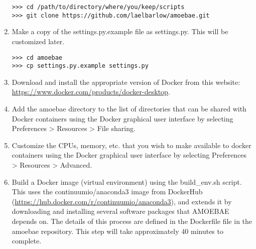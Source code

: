 \documentclass[12pt,letterpaper]{article}
\begin{document}
\begin{linenumbers}
\begin{enumerate}
\begin{lstlisting}
>>> cd /path/to/directory/where/you/keep/scripts
>>> git clone https://github.com/laelbarlow/amoebae.git
\end{lstlisting}


%



\item Make a copy of the settings.py.example file as settings.py. This will be
    customized later. 

\begin{lstlisting}
>>> cd amoebae
>>> cp settings.py.example settings.py
\end{lstlisting}


\item Download and install the appropriate version of Docker from this website:
    \url{https://www.docker.com/products/docker-desktop}.


\item Add the amoebae directory to the list of directories that can be shared
    with Docker containers using the Docker graphical user interface by
    selecting Preferences > Resources > File sharing.


\item Customize the CPUs, memory, etc. that you wish to make available to
    docker containers using the Docker graphical user interface by
    selecting Preferences > Resources > Advanced.


\item Build a Docker image (virtual environment) using the build\_env.sh
    script. This uses the continuumio/anaconda3 image from DockerHub
    (\sloppy\url{https://hub.docker.com/r/continuumio/anaconda3}), and extends it by
    downloading and installing several software packages that AMOEBAE depends
    on. The details of this process are defined in the Dockerfile file in
    the amoebae repository. This step will take approximately 40 minutes to
    complete.


\end{enumerate}
\end{linenumbers}
\end{document}
